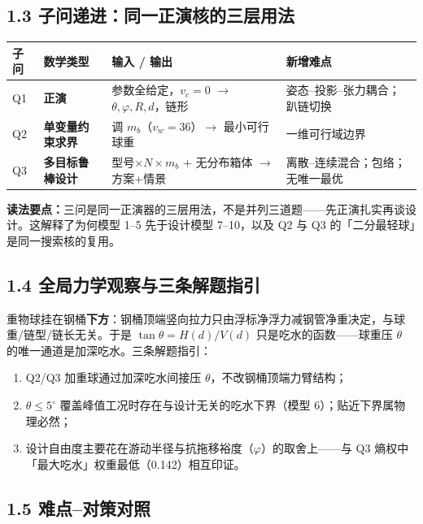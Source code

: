 \documentclass[UTF8,a4paper,zihao=-4]{ctexart}
\begin{document}
\subsection{\texorpdfstring{1.3 子问递进：同一正演核的三层用法}{1.3 子问递进}}

\begin{center}\footnotesize
\begin{tabularx}{\textwidth}{|>{\raggedright\arraybackslash}p{1.1cm}|>{\raggedright\arraybackslash}p{2.4cm}|>{\raggedright\arraybackslash}X|>{\raggedright\arraybackslash}p{3.2cm}|}
\hline
子问 & 数学类型 & 输入 / 输出 & 新增难点 \\
\hline
Q1 & \textbf{正演} & 参数全给定，$v_c=0$ $\to$ $\theta,\varphi,R,d$，链形 & 姿态--投影--张力耦合；趴链切换 \\
\hline
Q2 & \textbf{单变量约束求界} & 调 $m_b$（$v_w=36$）$\to$ 最小可行球重 & 一维可行域边界 \\
\hline
Q3 & \textbf{多目标鲁棒设计} & 型号$\times N\times m_b$ + 无分布箱体 $\to$ 方案+情景 & 离散--连续混合；包络；无唯一最优 \\
\hline
\end{tabularx}
\end{center}
\vspace{0.25em}
\textbf{读法要点：}三问是同一正演器的三层用法，不是并列三道题------先正演扎实再谈设计。这解释了为何模型 1--5 先于设计模型 7--10，以及 Q2 与 Q3 的「二分最轻球」是同一搜索核的复用。

\subsection{\texorpdfstring{1.4 全局力学观察与三条解题指引}{1.4 全局力学观察}}

重物球挂在钢桶\textbf{下方}：钢桶顶端竖向拉力只由浮标净浮力减钢管净重决定，与球重/链型/链长无关。于是 $\tan\theta=H(d)/V(d)$ 只是吃水的函数------球重压 $\theta$ 的唯一通道是加深吃水。三条解题指引：
\begin{enumerate}[leftmargin=1.6em,itemsep=0.12em]
\item Q2/Q3 加重球通过加深吃水间接压 $\theta$，不改钢桶顶端力臂结构；
\item $\theta\le5^\circ$ 覆盖峰值工况时存在与设计无关的吃水下界（模型 6）；贴近下界属物理必然；
\item 设计自由度主要花在游动半径与抗拖移裕度（$\varphi$）的取舍上------与 Q3 熵权中「最大吃水」权重最低（0.142）相互印证。
\end{enumerate}

\subsection{\texorpdfstring{1.5 难点--对策对照}{1.5 难点对策}}
\end{document}

